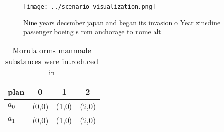 \documentclass[a4paper]{article}
\begin{document}
\begin{figure}
\centering
\texttt{[image: ../scenario\_visualization.png]}
\caption{Nine years december japan and began its invasion o Year zinedine passenger boeing s rom anchorage to nome alt
}
\end{figure}
 
\begin{table}
\begin{adjustbox}{width=0.6\columnwidth}
\begin{tabular}{|l|l|l|l|}
\hline
\textbf{plan} & \multicolumn{1}{c|}{\textbf{0}} & \multicolumn{1}{c|}{\textbf{1}} & \multicolumn{1}{c|}{\textbf{2}} \\ \hline
\textbf{$a_0$}  & (0,0) & (1,0) & (2,0) \\ \hline
\textbf{$a_1$}  & (0,0) & (1,0) & (2,0) \\ \hline
\end{tabular}
\end{adjustbox}
\caption{Morula orms manmade substances were introduced in
}
\end{table}
\end{document}
